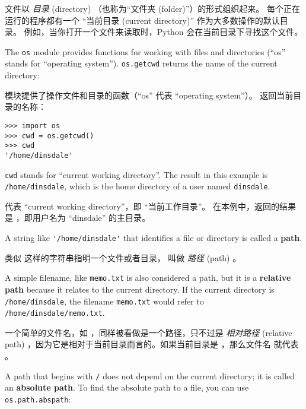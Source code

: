 {{{{{{{文件以 {\em 目录} (directory) （也称为``文件夹 (folder)''）的形式组织起来。
每个正在运行的程序都有一个 ``当前目录 (current directory)'' 作为大多数操作的默认目录。
例如，当你打开一个文件来读取时，Python 会在当前目录下寻找这个文件。

  

The {\tt os} module provides functions for working with files and
directories (``os'' stands for ``operating system'').  {\tt os.getcwd}
returns the name of the current directory:

 模块提供了操作文件和目录的函数（``os'' 代表 ``operating system''）。  返回当前目录的名称：

  

\begin{lstlisting}
>>> import os
>>> cwd = os.getcwd()
>>> cwd
'/home/dinsdale'
\end{lstlisting}
%
{\tt cwd} stands for ``current working directory''.  The result in
this example is {\tt /home/dinsdale}, which is the home directory of a
user named {\tt dinsdale}.

 代表 ``current working directory''，即 ``当前工作目录''。 
在本例中，返回的结果是  ，即用户名为 ``dinsdale'' 的主目录。

  

A string like \verb"'/home/dinsdale'" that identifies a file or
directory is called a {\bf path}.

类似  这样的字符串指明一个文件或者目录， 叫做 {\em 路径} (path) 。

A simple filename, like {\tt memo.txt} is also considered a path,
but it is a {\bf relative path} because it relates to the current
directory.  If the current directory is {\tt /home/dinsdale}, the
filename {\tt memo.txt} would refer to {\tt /home/dinsdale/memo.txt}.

一个简单的文件名，如  ，同样被看做是一个路径，只不过是 {\em 相对路径} (relative path) ，因为它是相对于当前目录而言的。如果当前目录是  ，那么文件名  就代表  。

 
 

A path that begins with {\tt /} does not depend on the current
directory; it is called an {\bf absolute path}.  To find the absolute
path to a file, you can use {\tt os.path.abspath}:

}}}}}}}
